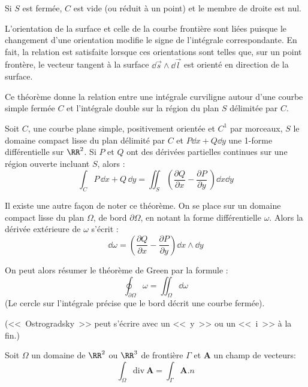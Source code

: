 Si $S$ est fermée, $C$ est vide (ou réduit à un point) et le membre de droite est nul.

\medskip
L'orientation de la surface et celle de la courbe frontière sont liées puisque le changement
d'une orientation modifie le signe de l'intégrale correspondante.
En fait, la relation est satisfaite lorsque ces orientations sont telles que, sur un point frontère,
le vecteur tangent à la surface $\dd \vec s \wedge \dd \vec l$ est orienté
en direction de la surface.


\medskip
\begin{theoreme}%

Ce théorème donne la relation entre une intégrale curviligne autour d'une courbe simple fermée $C$ et l'intégrale double sur la région du plan $S$ délimitée par $C$.

Soit $C$, une courbe plane simple, positivement orientée et $C^1$ par morceaux, $S$ le domaine compact lisse du plan délimité par $C$ et 
$P\dd x + Q\dd y$ une 1-forme différentielle sur $\RR^2$. Si $P$ et $Q$ ont des dérivées partielles continues sur une région ouverte incluant $S$, alors :
\begin{equation}
\int_C P\,\dd x + Q\,\dd y = \iint_S \left( \frac{\partial Q}{\partial x} - \frac{\partial P}{\partial y}\ \right) \dd x\dd y
\end{equation}
\end{theoreme}

\medskip{}
Il existe une autre façon de noter ce théorème.
On se place sur un domaine compact lisse du plan $\Omega$, de bord $\partial\Omega$,
en notant la forme différentielle $\omega$.
Alors la dérivée extérieure de $\omega$ s'écrit :
\begin{equation}
\dd \omega = \left( \frac{\partial Q}{\partial x} - \frac{\partial P}{\partial y} \right) \dd x \wedge \dd y
\end{equation}

On peut alors résumer le théorème de Green par la formule :
\begin{equation}
\oint_{\partial \Omega} \omega = \iint_{\Omega} \dd\omega
\end{equation}
(Le cercle sur l'intégrale précise que le bord décrit une courbe fermée).

\medskip
\begin{theoreme}%
%
(<<~Ostrogradsky~>> peut s'écrire avec un <<~y~>> ou un <<~i~>> à la fin.)
\medskip
{}

Soit $\Omega$ un domaine de $\RR^2$ ou $\RR^3$ de frontière $\Gamma$
et ${\mathbf{A} }$ un champ de vecteurs:
\begin{equation}
    \int_\Omega \mathrm{div}\ {\mathbf{A} }  = \int_\Gamma {\mathbf{A} }.n
\end{equation}
\end{theoreme}

